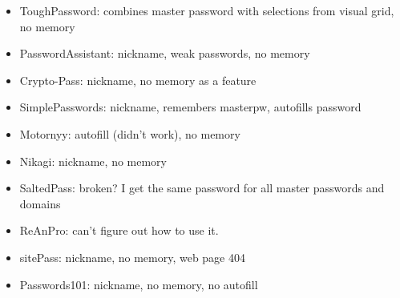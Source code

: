 \begin{itemize}

\item ToughPassword: combines master password with selections from visual grid, no memory


\item PasswordAssistant: nickname, weak passwords, no memory


\item Crypto-Pass: nickname, no memory as a feature


\item SimplePasswords: nickname, remembers masterpw, autofills password


\item Motornyy: autofill (didn't work), no memory


\item Nikagi: nickname, no memory


\item SaltedPass:  broken? I get the same password for all master passwords and domains


\item ReAnPro: can't figure out how to use it.


\item sitePass: nickname, no memory, web page 404


\item Passwords101: nickname, no memory, no autofill


\end{itemize}
